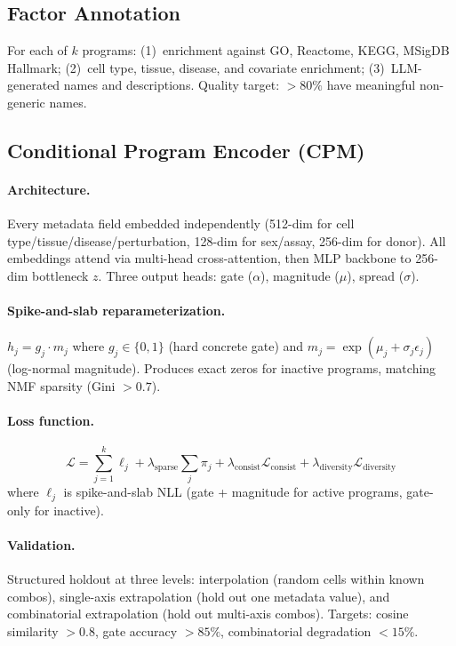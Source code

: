\documentclass[10pt,twocolumn,letterpaper]{article}
\begin{document}
\subsection{Factor Annotation}

For each of $k$ programs: (1)~enrichment against GO, Reactome, KEGG, MSigDB
Hallmark; (2)~cell type, tissue, disease, and covariate enrichment;
(3)~LLM-generated names and descriptions. Quality target: ${>}80\%$ have
meaningful non-generic names.

\subsection{Conditional Program Encoder (CPM)}

\paragraph{Architecture.} Every metadata field embedded independently
(512-dim for cell type/tissue/disease/perturbation, 128-dim for sex/assay,
256-dim for donor). All embeddings attend via multi-head cross-attention, then
MLP backbone to 256-dim bottleneck $z$. Three output heads: gate ($\alpha$),
magnitude ($\mu$), spread ($\sigma$).

\paragraph{Spike-and-slab reparameterization.} $h_j = g_j \cdot m_j$ where
$g_j \in \{0,1\}$ (hard concrete gate) and $m_j = \exp(\mu_j + \sigma_j
\epsilon_j)$ (log-normal magnitude). Produces exact zeros for inactive
programs, matching NMF sparsity (Gini ${>}0.7$).

\paragraph{Loss function.}
\begin{equation}
  \mathcal{L} = \sum_{j=1}^{k} \ell_j
  + \lambda_{\text{sparse}} \sum_j \pi_j
  + \lambda_{\text{consist}} \mathcal{L}_{\text{consist}}
  + \lambda_{\text{diversity}} \mathcal{L}_{\text{diversity}}
\end{equation}
where $\ell_j$ is spike-and-slab NLL (gate + magnitude for active programs,
gate-only for inactive).

\paragraph{Validation.} Structured holdout at three levels: interpolation
(random cells within known combos), single-axis extrapolation (hold out one
metadata value), and combinatorial extrapolation (hold out multi-axis combos).
Targets: cosine similarity ${>}0.8$, gate accuracy ${>}85\%$, combinatorial
degradation ${<}15\%$.
\end{document}
